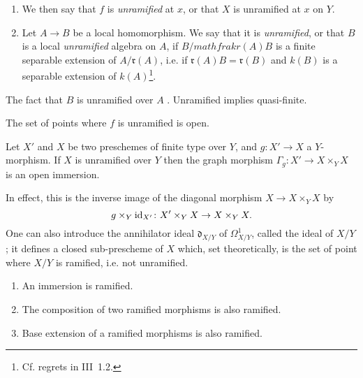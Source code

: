 \documentclass[../main.tex]{subfiles}
\begin{document}
\begin{defn}
    \begin{enumerate}[\normalfont(a)]
        \item We then say that $f$ is \emph{unramified} at $x$, or that $X$ is unramified at $x$ on $Y$.
        \item Let $A\to B$ be a local homomorphism.
            We say that it is \emph{unramified}, or that $B$ is a local \emph{unramified} algebra on $A$, if $B/mathfrak{r}(A)B$ is a finite separable extension of $A/\mathfrak{r}(A)$, i.e. if $\mathfrak{r}(A)B=\mathfrak{r}(B)$ and $k(B)$ is a separable extension of $k(A)$\footnote{Cf. regrets in III~1.2.}.
    \end{enumerate}
\end{defn}

\begin{rem}
    The fact that $B$ is unramified over $A$ \completelyunsure.
    Unramified implies quasi-finite.
\end{rem}

\begin{cor}
    The set of points where $f$ is unramified is open.
\end{cor}

\begin{cor}
    Let $X'$ and $X$ be two preschemes of finite type over $Y$, and $g\colon X'\to X$ a $Y$-morphism.
    If $X$ is unramified over $Y$ then the graph morphism $\Gamma_g\colon X'\to X\times_Y X$ is an open immersion.
\end{cor}

In effect, this is the inverse image of the diagonal morphism $X\to X\times_Y X$ by
\begin{equation*}
    g\times_Y \mathrm{id}_{X'}\colon X'\times_Y X\to X\times_Y X.
\end{equation*}
One can also introduce the annihilator ideal $\mathfrak{d}_{X/Y}$ of $\Omega_{X/Y}^1$, called the  ideal of $X/Y$; it defines a closed sub-prescheme of $X$ which, set theoretically, is the set of point where $X/Y$ is ramified, i.e. not unramified.

\begin{prop}
    \begin{enumerate}[\normalfont(i)]
        \item An immersion is ramified.
        \item The composition of two ramified morphisms is also ramified.
        \item Base extension of a ramified morphisms is also ramified.
    \end{enumerate}
\end{prop}
\end{document}
